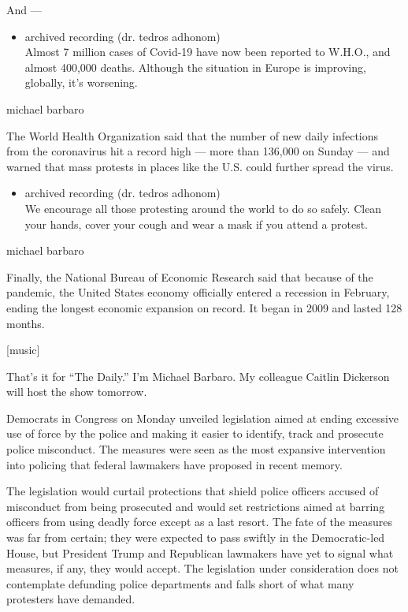 And ---

\begin{itemize}
\tightlist
\item
  archived recording (dr. tedros adhonom)\\
  Almost 7 million cases of Covid-19 have now been reported to W.H.O.,
  and almost 400,000 deaths. Although the situation in Europe is
  improving, globally, it's worsening.
\end{itemize}

michael barbaro

The World Health Organization said that the number of new daily
infections from the coronavirus hit a record high --- more than 136,000
on Sunday --- and warned that mass protests in places like the U.S.
could further spread the virus.

\begin{itemize}
\tightlist
\item
  archived recording (dr. tedros adhonom)\\
  We encourage all those protesting around the world to do so safely.
  Clean your hands, cover your cough and wear a mask if you attend a
  protest.
\end{itemize}

michael barbaro

Finally, the National Bureau of Economic Research said that because of
the pandemic, the United States economy officially entered a recession
in February, ending the longest economic expansion on record. It began
in 2009 and lasted 128 months.

{[}music{]}

That's it for ``The Daily.'' I'm Michael Barbaro. My colleague Caitlin
Dickerson will host the show tomorrow.

Democrats in Congress on Monday unveiled legislation aimed at ending
excessive use of force by the police and making it easier to identify,
track and prosecute police misconduct. The measures were seen as the
most expansive intervention into policing that federal lawmakers have
proposed in recent memory.

The legislation would curtail protections that shield police officers
accused of misconduct from being prosecuted and would set restrictions
aimed at barring officers from using deadly force except as a last
resort. The fate of the measures was far from certain; they were
expected to pass swiftly in the Democratic-led House, but President
Trump and Republican lawmakers have yet to signal what measures, if any,
they would accept. The legislation under consideration does not
contemplate defunding police departments and falls short of what many
protesters have demanded.

